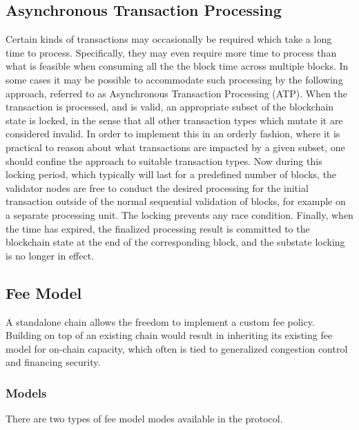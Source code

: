 \documentclass{article}
\begin{document}
\subsection{Asynchronous Transaction Processing}
\label{sec:asynchronous_transaction_processing}

Certain kinds of transactions may occasionally be required which take a long time to process. Specifically, they may even require more time to process than what is feasible when consuming all the the block time across multiple blocks. In some cases it may be possible to accommodate such processing by the following approach, referred to as Asynchronous Transaction Processing (ATP). When the transaction is processed, and is valid, an appropriate subset of the blockchain state is locked, in the sense that all other transaction types which mutate it are considered invalid. In order to implement this in an orderly fashion, where it is practical to reason about what transactions are impacted by a given subset, one should confine the approach to suitable transaction types. Now during this locking period, which typically will last for a predefined number of blocks, the validator nodes are free to conduct the desired processing for the initial transaction outside of the normal sequential validation of blocks, for example on a separate processing unit. The locking prevents any race condition. Finally, when the time has expired, the finalized processing result is committed to the blockchain state at the end of the corresponding block, and the substate locking is no longer in effect.


\subsection{Fee Model}

A standalone chain allows the freedom to implement a custom fee policy. Building on top of an existing chain would result in inheriting its existing fee model for on-chain capacity, which often is tied to generalized congestion control and financing security.

\subsubsection{Models}

There are two types of fee model modes available in the protocol.
\end{document}

